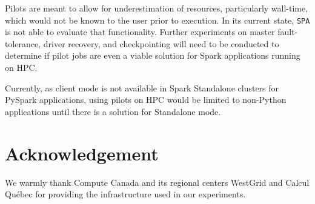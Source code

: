     Pilots are meant to allow for underestimation of resources, particularly
    wall-time, which would not be known to the user prior to execution. In its
    current state, \texttt{SPA} is not able to evaluate that functionality.
    Further experiments on master fault-tolerance, driver recovery, and
    checkpointing will need to be conducted to determine if pilot jobs are even
    a viable solution for Spark applications running on HPC.
    
    Currently, as client mode is not available in Spark Standalone clusters for
    PySpark applications, using pilots on HPC would be limited to non-Python
    applications until there is a solution for Standalone mode.
    
    \section*{Acknowledgement}
    
    We warmly thank Compute Canada and its regional centers WestGrid and Calcul
    Qu\'ebec for providing the infrastructure used in our experiments.
    